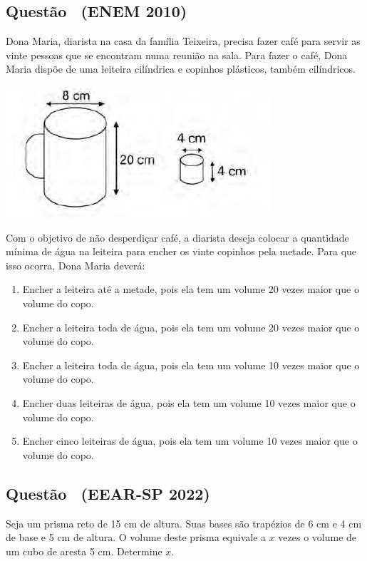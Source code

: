 \documentclass[12pt]{article}
\newcounter{questao}
\newcommand{\novaquestao}[1]{%
  \stepcounter{questao}%
  \subsection*{Questão \thequestao\ (#1)}%
}
\begin{document}
\begin{multicols}{2}
        \novaquestao{ENEM 2010}
            Dona Maria, diarista na casa da família Teixeira, precisa fazer café para servir as vinte pessoas que se encontram numa reunião na sala. Para fazer o café, Dona Maria dispõe de uma leiteira cilíndrica e copinhos plásticos, também cilíndricos.

            \begin{center}
                \includegraphics[scale=0.6]{q31.png}
            \end{center} Com o objetivo de não desperdiçar café, a diarista deseja colocar a quantidade mínima de água na leiteira para encher os vinte copinhos pela metade. Para que isso ocorra, Dona Maria deverá:

            \begin{enumerate}[label=(\alph*), noitemsep]
                \item {Encher a leiteira até a metade, pois ela tem um volume 20 vezes maior que o volume do copo.} \\ %
                \item Encher a leiteira toda de água, pois ela tem um volume 20 vezes maior que o volume do copo. \\
                \item Encher a leiteira toda de água, pois ela tem um volume 10 vezes maior que o volume do copo. \\
                \item Encher duas leiteiras de água, pois ela tem um volume 10 vezes maior que o volume do copo. \\
                \item Encher cinco leiteiras de água, pois ela tem um volume 10 vezes maior que o volume do copo. 
            \end{enumerate}
        

        \novaquestao{EEAR-SP 2022}
            Seja um prisma reto de 15 cm de altura. Suas bases são trapézios de 6 cm e 4 cm de base e 5 cm de altura. O volume deste prisma equivale a $ x $ vezes o volume de um cubo de aresta 5 cm. Determine $x$.
        

\end{multicols}
\end{document}
